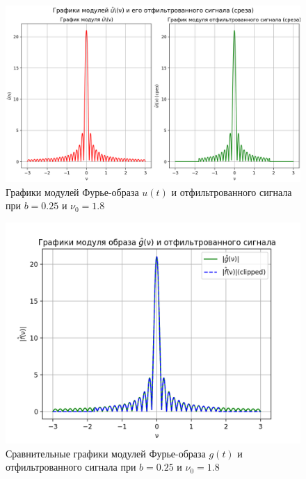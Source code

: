 \begin{figure}[ht!]
    \centering
    \includegraphics[scale=0.55]{media/1 task/high_freq/Fourier_Image_0,25_-1,7987987987987988.png}
    \caption{Графики модулей Фурье-образа $u(t)$ и отфильтрованного сигнала при $b=0.25$ и $\nu_0=1.8$}
    \label{fig:four_025_18}
\end{figure}

\begin{figure}[ht!]
    \centering
    \includegraphics[scale=0.55]{media/1 task/high_freq/Fourier_Image_Comparison_0,25_-1,7987987987987988.png}
    \caption{Сравнительные графики модулей Фурье-образа $g(t)$ и отфильтрованного сигнала при $b=0.25$ и $\nu_0=1.8$}
    \label{fig:fourc_025_18}
\end{figure}